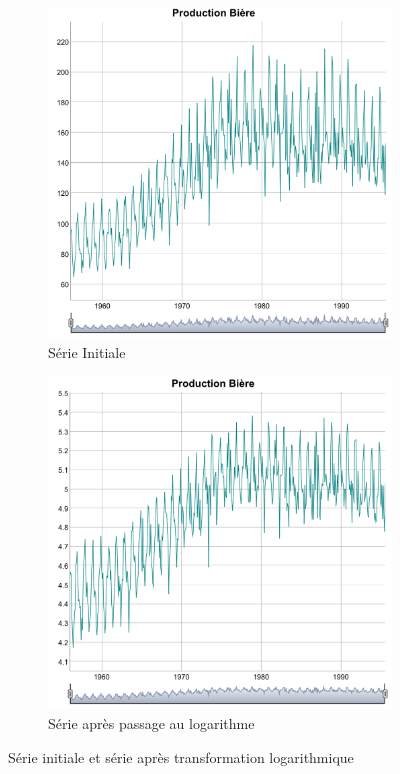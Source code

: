 \documentclass[12pt,a4paper]{book}
\newcommand{\1}{\mathds{1}}
\begin{document}
\begin{figure}[h]
\centering
	\begin{subfigure}{.4\textwidth}
    	\includegraphics[width=\textwidth]{plot_beer}  
    	\caption{Série Initiale}
    	\label{fig:sub1}
    \end{subfigure}
    \begin{subfigure}{.4\textwidth}
    	\includegraphics[width=\textwidth]{Log_Series}  
    	\caption{Série après passage au logarithme}
    	\label{fig:sub2}
    \end{subfigure}

\caption{Série initiale et série après transformation logarithmique}
\label{fig:1}
\end{figure}
\end{document}
